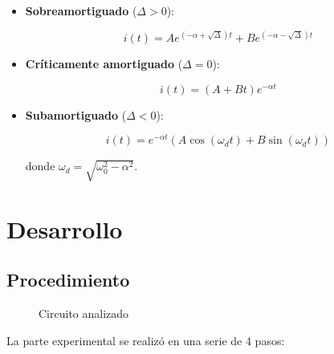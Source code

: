 \documentclass{article}
\begin{document}
\begin{itemize}
  \item \textbf{Sobreamortiguado} (\( \Delta > 0 \)):

  \begin{equation}
  i(t) = A e^{(-\alpha + \sqrt{\Delta})t} + B e^{(-\alpha - \sqrt{\Delta})t}
  \end{equation}

  \item \textbf{Críticamente amortiguado} (\( \Delta = 0 \)):

  \begin{equation}
  i(t) = (A + Bt)e^{-\alpha t}
  \end{equation}

  \item \textbf{Subamortiguado} (\( \Delta < 0 \)):

  \begin{equation}
  i(t) = e^{-\alpha t} \left( A \cos(\omega_d t) + B \sin(\omega_d t) \right)
  \end{equation}

  donde \( \omega_d = \sqrt{\omega_0^2 - \alpha^2} \).
\end{itemize}

\section{Desarrollo}
    \subsection{Procedimiento}

\begin{figure}[H]
    \centering
    \caption{Circuito analizado}
    \label{fig: circuito_rlc}
\end{figure}


    La parte experimental se realizó en una serie de 4 pasos:
\end{document}

